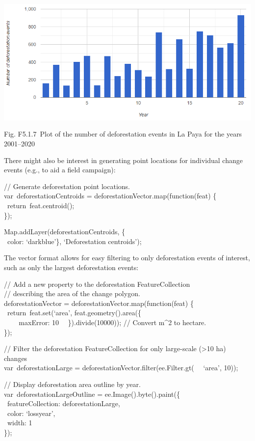 \documentclass[
  letterpaper,
  DIV=11,
  numbers=noendperiod]{scrreprt}
\begin{document}
\includegraphics{./F5/image15.png}

Fig. F5.1.7~Plot of the number of deforestation events in La Paya for
the years 2001--2020

There might also be interest in generating point locations for
individual change events (e.g., to aid a field campaign):

// Generate deforestation point locations.\\
var~deforestationCentroids = deforestationVector.map(function(feat) \{~
~return~feat.centroid();\\
\});

Map.addLayer(deforestationCentroids, \{\\
\hspace*{0.333em} ~color: `darkblue'\}, `Deforestation centroids');

The vector format allows for easy filtering to only deforestation events
of interest, such as only the largest deforestation events:

// Add a new property to the deforestation FeatureCollection\\
// describing the area of the change polygon.\\
deforestationVector = deforestationVector.map(function(feat) \{~
~return~feat.set(`area', feat.geometry().area(\{\\
\hspace*{0.333em} ~ ~ ~maxError: 10~ ~\}).divide(10000)); // Convert
m\^{}2 to hectare.\\
\});

// Filter the deforestation FeatureCollection for only large-scale
(\textgreater10 ha) changes\\
var~deforestationLarge = deforestationVector.filter(ee.Filter.gt(~
~`area', 10));

// Display deforestation area outline by year.\\
var~deforestationLargeOutline = ee.Image().byte().paint(\{\\
\hspace*{0.333em} ~featureCollection: deforestationLarge,\\
\hspace*{0.333em} ~color: `lossyear',\\
\hspace*{0.333em} ~width: 1\\
\});
\end{document}
